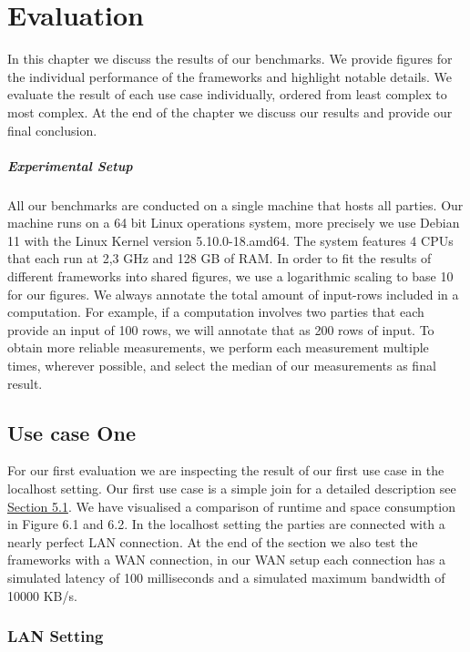 \chapter{Evaluation}
\label{Evaluation}	
In this chapter we discuss the results of our benchmarks. We provide figures for the individual performance of the frameworks and highlight notable details. We evaluate the result of each use case individually, ordered from least complex to most complex. At the end of the chapter we discuss our results and provide our final conclusion.
\paragraph{Experimental Setup}
All our benchmarks are conducted on a single machine that hosts all parties. Our machine runs on a 64 bit Linux operations system, more precisely we use Debian 11 with the Linux Kernel version 5.10.0-18.amd64. The system features 4 CPUs that each run at 2,3 GHz and 128 GB of RAM. In order to fit the results of different frameworks into shared figures, we use a logarithmic scaling to base 10 for our figures. We always annotate the total amount of input-rows included in a computation. For example, if a computation involves two parties that each provide an input of 100 rows, we will annotate that as 200 rows of input. To obtain more reliable measurements, we perform each measurement multiple times, wherever possible, and select the median of our measurements as final result.
\section{Use case One}
For our first evaluation we are inspecting the result of our first use case in the localhost setting. Our first use case is a simple join for a detailed description see \hyperref[Use Case]{Section 5.1}. We have visualised a comparison of runtime and space consumption in Figure 6.1 and 6.2. In the localhost setting the parties are connected with a nearly perfect LAN connection. At the end of the section we also test the frameworks with a WAN connection, in our WAN setup each connection has a simulated latency of 100 milliseconds and a simulated maximum bandwidth of 10000 KB/s.
\subsection{LAN Setting}
